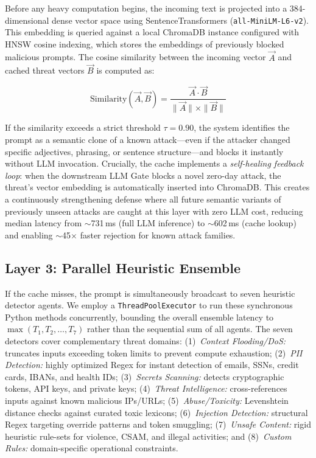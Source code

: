 \documentclass[conference]{IEEEtran}
\begin{document}
Before any heavy computation begins, the incoming text is projected
into a 384-dimensional dense vector space using SentenceTransformers
(\texttt{all-MiniLM-L6-v2}). This embedding is queried against a
local ChromaDB instance configured with HNSW cosine indexing, which
stores the embeddings of previously blocked malicious prompts. The
cosine similarity between the incoming vector $\vec{A}$ and cached
threat vectors $\vec{B}$ is computed as:

\begin{equation}
\text{Similarity}(\vec{A}, \vec{B}) =
    \frac{\vec{A} \cdot \vec{B}}{\|\vec{A}\| \times \|\vec{B}\|}
\label{eq:cosine}
\end{equation}

If the similarity exceeds a strict threshold $\tau{=}0.90$, the
system identifies the prompt as a semantic clone of a known
attack---even if the attacker changed specific adjectives, phrasing,
or sentence structure---and blocks it instantly without LLM
invocation. Crucially, the cache implements a \textit{self-healing
feedback loop}: when the downstream LLM Gate blocks a novel zero-day
attack, the threat's vector embedding is automatically inserted into
ChromaDB. This creates a continuously strengthening defense where all
future semantic variants of previously unseen attacks are caught at
this layer with zero LLM cost, reducing median latency from
$\sim$731\,ms (full LLM inference) to $\sim$602\,ms (cache lookup)
and enabling $\sim$45$\times$ faster rejection for known attack
families.

\subsection{Layer 3: Parallel Heuristic Ensemble}

If the cache misses, the prompt is simultaneously broadcast to seven
heuristic detector agents. We employ a \texttt{ThreadPoolExecutor} to
run these synchronous Python methods concurrently, bounding the overall
ensemble latency to $\max(T_1, T_2, \dots, T_7)$ rather than the
sequential sum of all agents. The seven detectors cover complementary
threat domains: (1)~\textit{Context Flooding/DoS:} truncates
inputs exceeding token limits to prevent compute exhaustion;
(2)~\textit{PII Detection:} highly optimized Regex for instant
detection of emails, SSNs, credit cards, IBANs, and health IDs;
(3)~\textit{Secrets Scanning:} detects cryptographic tokens, API
keys, and private keys; (4)~\textit{Threat Intelligence:}
cross-references inputs against known malicious IPs/URLs;
(5)~\textit{Abuse/Toxicity:} Levenshtein distance checks against
curated toxic lexicons; (6)~\textit{Injection Detection:} structural
Regex targeting override patterns and token smuggling;
(7)~\textit{Unsafe Content:} rigid heuristic rule-sets for violence,
CSAM, and illegal activities; and (8)~\textit{Custom Rules:} domain-specific
operational constraints.
\end{document}
